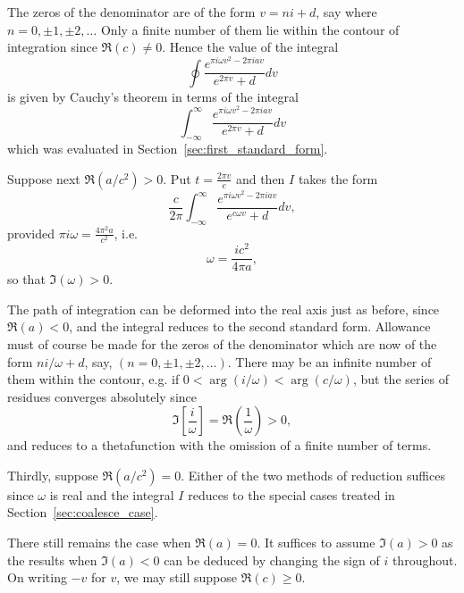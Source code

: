 \documentclass[12pt]{article}
\theoremstyle{remark}
\begin{document}
The zeros of the denominator are of the form $v = ni + d$, say where $n = 0, \pm 1, \pm 2, \ldots$ Only a finite number of them lie within the contour of integration since $\Re(c) \neq 0$. Hence the value of the integral
\begin{equation}\label{eq:contour_result}
\oint \frac{e^{\pi i\omega v^2 - 2\pi iav}}{e^{2\pi v} + d} dv
\end{equation}
is given by Cauchy's theorem in terms of the integral
\begin{equation}\label{eq:real_axis_integral}
\int_{-\infty}^\infty \frac{e^{\pi i\omega v^2 - 2\pi iav}}{e^{2\pi v} + d} dv
\end{equation}
which was evaluated in Section~\ref{sec:first_standard_form}.

Suppose next $\Re(a/c^2) > 0$. Put $t = \frac{2\pi v}{c}$ and then $I$ takes the form
\begin{equation}\label{eq:reduced_form2}
\frac{c}{2\pi} \int_{-\infty}^\infty \frac{e^{\pi i\omega v^2 - 2\pi iav}}{e^{c\omega v} + d} dv,
\end{equation}
provided $\pi i\omega = \frac{4\pi^2 a}{c^2}$, i.e.
\begin{equation}\label{eq:omega_relation}
\omega = \frac{ic^2}{4\pi a},
\end{equation}
so that $\Im(\omega) > 0$.

The path of integration can be deformed into the real axis just as before, since $\Re(a) < 0$, and the integral reduces to the second standard form. Allowance must of course be made for the zeros of the denominator which are now of the form $ni/\omega + d$, say, $(n = 0, \pm 1, \pm 2, \ldots)$. There may be an infinite number of them within the contour, e.g. if $0 < \arg(i/\omega) < \arg(c/\omega)$, but the series of residues converges absolutely since
\begin{equation}\label{eq:convergence_condition}
\Im\left[\frac{i}{\omega}\right] = \Re\left(\frac{1}{\omega}\right) > 0,
\end{equation}
and reduces to a thetafunction with the omission of a finite number of terms.

Thirdly, suppose $\Re(a/c^2) = 0$. Either of the two methods of reduction suffices since $\omega$ is real and the integral $I$ reduces to the special cases treated in Section~\ref{sec:coalesce_case}.

There still remains the case when $\Re(a) = 0$. It suffices to assume $\Im(a) > 0$ as the results when $\Im(a) < 0$ can be deduced by changing the sign of $i$ throughout. On writing $-v$ for $v$, we may still suppose $\Re(c) \geq 0$.
\end{document}
